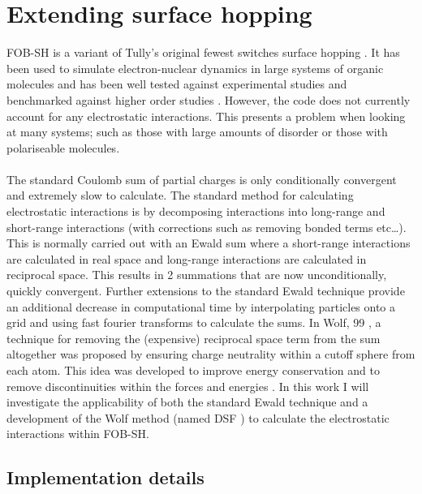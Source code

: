 \chapter{Extending surface hopping}
\label{chap:surface_hopping_ES}

\noindent FOB-SH is a variant of Tully's original fewest switches surface hopping \cite{FSSH_orig}. It has been used to simulate electron-nuclear dynamics in large systems of organic molecules and has been well tested against experimental studies and benchmarked against higher order studies \cite{FlickPolarons, Giannini2018Crossover, Giannini2019,             C9TC05270D, Carof2017FSSH, C9FD00046A, C9CP04770K, FOB-SH_Spencer,        C6FD00107F}. However, the code does not currently account for any electrostatic interactions. This presents a problem when looking at many systems; such as those with large amounts of disorder or those with polariseable molecules. 
\\\\
The standard Coulomb sum of partial charges is only conditionally convergent and extremely slow to calculate. The standard method for calculating electrostatic interactions is by decomposing interactions into long-range and short-range interactions (with corrections such as removing bonded terms etc\ldots). This is normally carried out with an Ewald sum \cite{Ewald} where a short-range interactions are calculated in real space and long-range interactions are calculated in reciprocal space. This results in 2 summations that are now unconditionally, quickly convergent. Further extensions to the standard Ewald technique provide an additional decrease in computational time by interpolating particles onto a grid and using fast fourier transforms to calculate the sums. In Wolf, 99 \cite{Wolf99}, a technique for removing the (expensive) reciprocal space term from the sum altogether was proposed by ensuring charge neutrality within a cutoff sphere from each atom. This idea was developed to improve energy conservation and to remove discontinuities within the forces and energies \cite{Zahn2002, DSF}. In this work I will investigate the applicability of both the standard Ewald technique and a development of the Wolf method (named DSF \cite{DSF}) to calculate the electrostatic interactions within FOB-SH.
\section{Implementation details}
